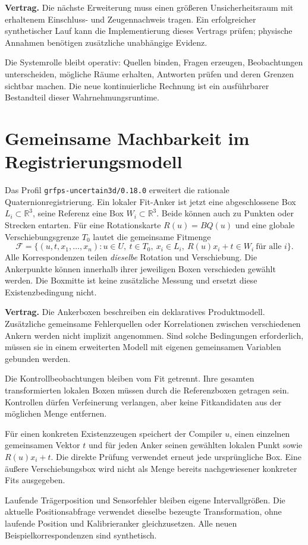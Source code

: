 \documentclass[11pt,a4paper]{article}
\newcommand{\R}{\mathbb R}
\newcommand{\contract}[1]{\vspace{3pt}\noindent\colorbox{pale}{\parbox{\dimexpr\linewidth-2\fboxsep}{\textbf{Vertrag.} #1}}\vspace{5pt}}
\newcommand{\nextsection}[2]{\clearpage{\color{accent}\small\textsf{#1}}\section{#2}}
\begin{document}
\contract{Die nächste Erweiterung muss einen größeren
Unsicherheitsraum mit erhaltenem Einschluss- und Zeugennachweis
tragen. Ein erfolgreicher synthetischer Lauf kann die
Implementierung dieses Vertrags prüfen; physische Annahmen
benötigen zusätzliche unabhängige Evidenz.}

Die Systemrolle bleibt operativ: Quellen binden, Fragen erzeugen,
Beobachtungen unterscheiden, mögliche Räume erhalten,
Antworten prüfen und deren Grenzen sichtbar machen. Die neue
kontinuierliche Rechnung ist ein ausführbarer Bestandteil dieser
Wahrnehmungsruntime.


\nextsection{106 / UNSICHERE LOKALE ANKER}{Gemeinsame Machbarkeit im Registrierungsmodell}
Das Profil \texttt{grfps-uncertain3d/0.18.0} erweitert die rationale
Quaternionregistrierung. Ein lokaler Fit-Anker ist jetzt eine
abgeschlossene Box $L_i\subset\R^3$, seine Referenz eine Box
$W_i\subset\R^3$. Beide können auch zu Punkten oder Strecken
entarten. Für eine Rotationskarte $R(u)=BQ(u)$ und eine globale
Verschiebungsgrenze $T_0$ lautet die gemeinsame Fitmenge
\[
 \mathcal F=\{(u,t,x_1,\ldots,x_n):u\in U,\ t\in T_0,
 \ x_i\in L_i,\ R(u)x_i+t\in W_i\ \text{für alle }i\}.
\]
Alle Korrespondenzen teilen \emph{dieselbe} Rotation und
Verschiebung. Die Ankerpunkte können innerhalb ihrer jeweiligen
Boxen verschieden gewählt werden. Die Boxmitte ist keine
zusätzliche Messung und ersetzt diese Existenzbedingung nicht.

\contract{Die Ankerboxen beschreiben ein deklaratives Produktmodell.
Zusätzliche gemeinsame Fehlerquellen oder Korrelationen zwischen
verschiedenen Ankern werden nicht implizit angenommen. Sind solche
Bedingungen erforderlich, müssen sie in einem erweiterten Modell
mit eigenen gemeinsamen Variablen gebunden werden.}

Die Kontrollbeobachtungen bleiben vom Fit getrennt. Ihre gesamten
transformierten lokalen Boxen müssen durch die Referenzboxen
getragen sein. Kontrollen dürfen Verfeinerung verlangen, aber
keine Fitkandidaten aus der möglichen Menge entfernen.

Für einen konkreten Existenzzeugen speichert der Compiler
$u$, einen einzelnen gemeinsamen Vektor $t$ und für jeden Anker
seinen gewählten lokalen Punkt sowie $R(u)x_i+t$.
Die direkte Prüfung verwendet erneut jede ursprüngliche Box.
Eine äußere Verschiebungsbox wird nicht als Menge bereits
nachgewiesener konkreter Fits ausgegeben.

Laufende Trägerposition und Sensorfehler bleiben eigene
Intervallgrößen. Die aktuelle Positionsabfrage verwendet dieselbe
bezeugte Transformation, ohne laufende Position und Kalibrieranker
gleichzusetzen. Alle neuen Beispielkorrespondenzen sind synthetisch.
\end{document}
